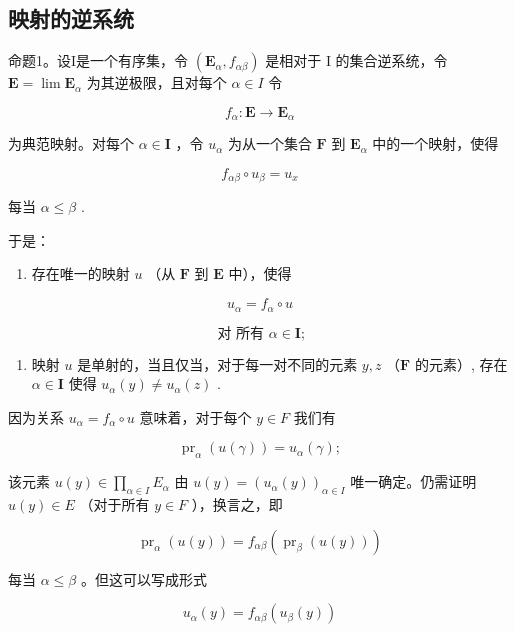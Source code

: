 \subsection{映射的逆系统}

命题1。设I是一个有序集，令 \((\mathbf{E}_{\alpha}, f_{\alpha \beta})\) 是相对于 I 的集合逆系统，令 \(\mathbf{E} = \lim \mathbf{E}_{\alpha}\) 为其逆极限，且对每个 \(\alpha \in I\) 令

\[
f _ {\alpha}: \mathbf {E} \rightarrow \mathbf {E} _ {\alpha}
\]

为典范映射。对每个 \(\alpha \in \mathbf{I}\) ，令 \(u_{\alpha}\) 为从一个集合 \(\mathbf{F}\) 到 \(\mathbf{E}_{\alpha}\) 中的一个映射，使得

\[
f _ {\alpha \beta} \circ u _ {\beta} = u _ {x}\tag{5}
\]

每当 \(\alpha \leqslant \beta\) .

于是：

\begin{enumerate}
\def\labelenumi{(\alph{enumi})}
\tightlist
\item
  存在唯一的映射 \(u\) （从 \(\mathbf{F}\) 到 \(\mathbf{E}\) 中），使得
\end{enumerate}

\[
u _ {\alpha} = f _ {\alpha} \circ u\tag{6}
\]

\[
\text { 对   所有 } \alpha \in \mathbf {I};
\]

\begin{enumerate}
\def\labelenumi{(\alph{enumi})}
\setcounter{enumi}{1}
\tightlist
\item
  映射 \(u\) 是单射的，当且仅当，对于每一对不同的元素 \(y, z\) （\(\mathbf{F}\) 的元素）, 存在 \(\alpha \in \mathbf{I}\) 使得 \(u_{\alpha}(y) \neq u_{\alpha}(z)\) .
\end{enumerate}

因为关系 \(u_{\alpha} = f_{\alpha} \circ u\) 意味着，对于每个 \(y \in F\) 我们有

\[
\operatorname{pr} _ {\alpha} (u (\gamma)) = u _ {\alpha} (\gamma);
\]

该元素 \(u(y) \in \prod_{\alpha \in I} E_{\alpha}\) 由 \(u(y) = (u_{\alpha}(y))_{\alpha \in I}\) 唯一确定。仍需证明 \(u(y) \in E\) （对于所有 \(y \in F\) ），换言之，即

\[
\operatorname{pr} _ {\alpha} (u (y)) = f _ {\alpha \beta} (\operatorname{pr} _ {\beta} (u (y)))
\]

每当 \(\alpha \leqslant \beta\) 。但这可以写成形式

\[
u _ {\alpha} (y) = f _ {\alpha \beta} (u _ {\beta} (y))
\]

